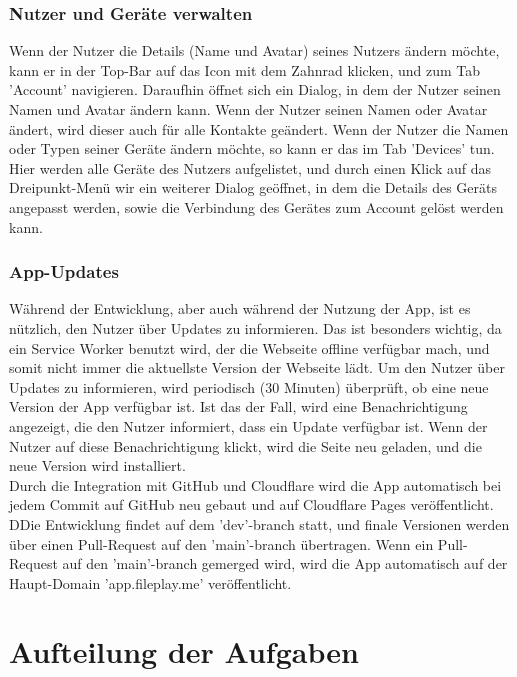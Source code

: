 \documentclass[a4paper]{article}
\begin{document}
\subsubsection{Nutzer und Geräte verwalten}

Wenn der Nutzer die Details (Name und Avatar) seines Nutzers ändern möchte, kann
er in der Top-Bar auf das Icon mit dem Zahnrad klicken, und zum Tab 'Account'
navigieren. Daraufhin öffnet sich ein Dialog, in dem der Nutzer seinen Namen und
Avatar ändern kann. Wenn der Nutzer seinen Namen oder Avatar ändert, wird dieser
auch für alle Kontakte geändert. Wenn der Nutzer die Namen oder Typen seiner
Geräte ändern möchte, so kann er das im Tab 'Devices' tun. Hier werden alle
Geräte des Nutzers aufgelistet, und durch einen Klick auf das Dreipunkt-Menü wir
ein weiterer Dialog geöffnet, in dem die Details des Geräts angepasst werden,
sowie die Verbindung des Gerätes zum Account gelöst werden kann.

\subsubsection{App-Updates}

Während der Entwicklung, aber auch während der Nutzung der App, ist es nützlich,
den Nutzer über Updates zu informieren. Das ist besonders wichtig, da ein
Service Worker benutzt wird, der die Webseite offline verfügbar mach, und somit
nicht immer die aktuellste Version der Webseite lädt. Um den Nutzer über Updates
zu informieren, wird periodisch (30 Minuten) überprüft, ob eine neue Version der
App verfügbar ist. Ist das der Fall, wird eine Benachrichtigung angezeigt, die
den Nutzer informiert, dass ein Update verfügbar ist. Wenn der Nutzer auf diese
Benachrichtigung klickt, wird die Seite neu geladen, und die neue Version wird
installiert.\\
Durch die Integration mit GitHub und Cloudflare wird die App automatisch bei
jedem Commit auf GitHub neu gebaut und auf Cloudflare Pages veröffentlicht. DDie
Entwicklung findet auf dem 'dev'-branch statt, und finale Versionen werden über
einen Pull-Request auf den 'main'-branch übertragen. Wenn ein Pull-Request auf
den 'main'-branch gemerged wird, wird die App automatisch auf der Haupt-Domain
'app.fileplay.me' veröffentlicht.


\section{Aufteilung der Aufgaben}
\end{document}
